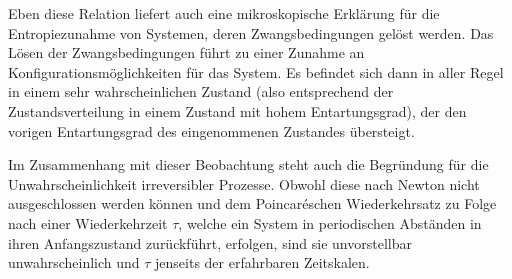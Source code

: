 \begin{summary}
    Eben diese Relation liefert auch eine mikroskopische Erklärung für die Entropiezunahme von Systemen, deren Zwangsbedingungen gelöst werden. Das Lösen der Zwangsbedingungen führt zu einer Zunahme an Konfigurationsmöglichkeiten für das System. Es befindet sich dann in aller Regel in einem sehr wahrscheinlichen Zustand (also entsprechend der Zustandsverteilung in einem Zustand mit hohem Entartungsgrad), der den vorigen Entartungsgrad des eingenommenen Zustandes übersteigt.

    Im Zusammenhang mit dieser Beobachtung steht auch die Begründung für die Unwahrscheinlichkeit irreversibler Prozesse. Obwohl diese nach Newton nicht ausgeschlossen werden können und dem Poincaréschen Wiederkehrsatz zu Folge nach einer Wiederkehrzeit $\tau$, welche ein System in periodischen Abständen in ihren Anfangszustand zurückführt, erfolgen, sind sie unvorstellbar unwahrscheinlich und $\tau$ jenseits der erfahrbaren Zeitskalen.
\end{summary}
